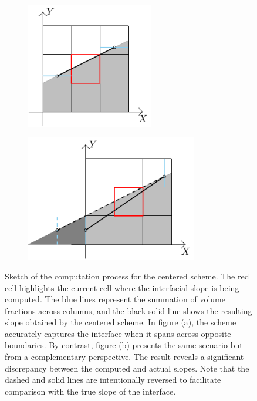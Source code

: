 \begin{figure}[H]
    \centering
    \begin{subfigure}[t]{0.45\textwidth}
        \centering
        \includegraphics[height=5.5cm]{./image/myc-h-and-myc2d-h/centered-a.pdf}
        \subcaption{}
        \label{fig:myc-centered-a}
    \end{subfigure}
    \begin{subfigure}[t]{0.45\textwidth}
        \centering
        \includegraphics[height=5.5cm]{./image/myc-h-and-myc2d-h/centered-b.pdf}
        \subcaption{}
        \label{fig:myc-centered-b}
    \end{subfigure}
    \caption{Sketch of the computation process for the centered scheme. The red cell highlights the current cell where the interfacial slope is being computed. The blue lines represent the summation of volume fractions across columns, and the black solid line shows the resulting slope obtained by the centered scheme. In figure (a), the scheme accurately captures the interface when it spans across opposite boundaries. By contrast, figure (b) presents the same scenario but from a complementary perspective. The result reveals a significant discrepancy between the computed and actual slopes. Note that the dashed and solid lines are intentionally reversed to facilitate comparison with the true slope of the interface.}
    \label{fig:myc-centered}
\end{figure}

